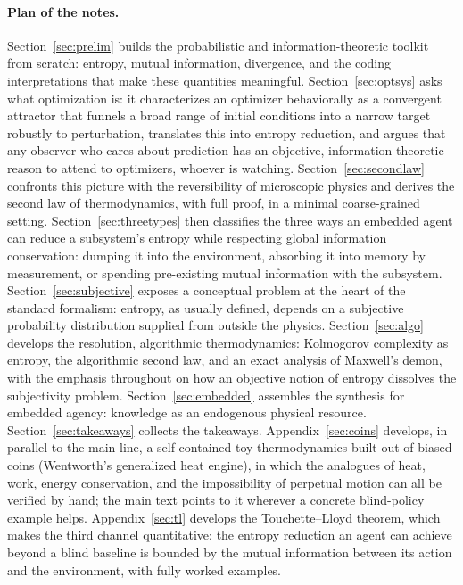 \documentclass[10pt]{article}
\theoremstyle{definition}
\theoremstyle{remark}
\begin{document}
\paragraph{Plan of the notes.} Section~\ref{sec:prelim} builds the probabilistic and information-theoretic toolkit from scratch: entropy, mutual information, divergence, and the coding interpretations that make these quantities meaningful. Section~\ref{sec:optsys} asks what optimization is: it characterizes an optimizer behaviorally as a convergent attractor that funnels a broad range of initial conditions into a narrow target robustly to perturbation, translates this into entropy reduction, and argues that any observer who cares about prediction has an objective, information-theoretic reason to attend to optimizers, whoever is watching. Section~\ref{sec:secondlaw} confronts this picture with the reversibility of microscopic physics and derives the second law of thermodynamics, with full proof, in a minimal coarse-grained setting. Section~\ref{sec:threetypes} then classifies the three ways an embedded agent can reduce a subsystem's entropy while respecting global information conservation: dumping it into the environment, absorbing it into memory by measurement, or spending pre-existing mutual information with the subsystem. Section~\ref{sec:subjective} exposes a conceptual problem at the heart of the standard formalism: entropy, as usually defined, depends on a subjective probability distribution supplied from outside the physics. Section~\ref{sec:algo} develops the resolution, algorithmic thermodynamics: Kolmogorov complexity as entropy, the algorithmic second law, and an exact analysis of Maxwell's demon, with the emphasis throughout on how an objective notion of entropy dissolves the subjectivity problem. Section~\ref{sec:embedded} assembles the synthesis for embedded agency: knowledge as an endogenous physical resource. Section~\ref{sec:takeaways} collects the takeaways. Appendix~\ref{sec:coins} develops, in parallel to the main line, a self-contained toy thermodynamics built out of biased coins (Wentworth's generalized heat engine), in which the analogues of heat, work, energy conservation, and the impossibility of perpetual motion can all be verified by hand; the main text points to it wherever a concrete blind-policy example helps. Appendix~\ref{sec:tl} develops the Touchette--Lloyd theorem, which makes the third channel quantitative: the entropy reduction an agent can achieve beyond a blind baseline is bounded by the mutual information between its action and the environment, with fully worked examples.
\end{document}
